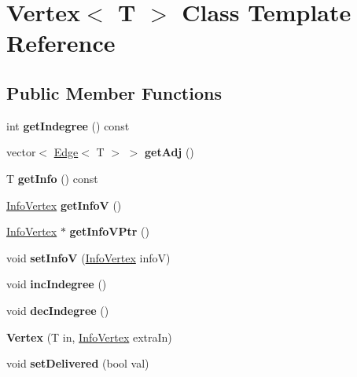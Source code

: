 \hypertarget{class_vertex}{}\section{Vertex$<$ T $>$ Class Template Reference}
\label{class_vertex}
\subsection*{Public Member Functions}
\begin{DoxyCompactItemize}
\item 
\hypertarget{class_vertex_ac78980191ea1f9d22e6617e9e511b755}{}\label{class_vertex_ac78980191ea1f9d22e6617e9e511b755} 
int {\bfseries get\+Indegree} () const
\item 
\hypertarget{class_vertex_aa8f7822976771f28e9a37199bcab69aa}{}\label{class_vertex_aa8f7822976771f28e9a37199bcab69aa} 
vector$<$ \hyperlink{class_edge}{Edge}$<$ T $>$ $>$ {\bfseries get\+Adj} ()
\item 
\hypertarget{class_vertex_a48eae2f7af2362634adab02b7b2dbec6}{}\label{class_vertex_a48eae2f7af2362634adab02b7b2dbec6} 
T {\bfseries get\+Info} () const
\item 
\hypertarget{class_vertex_aa060ea5a18371292e64b9773e9909e0e}{}\label{class_vertex_aa060ea5a18371292e64b9773e9909e0e} 
\hyperlink{class_info_vertex}{Info\+Vertex} {\bfseries get\+InfoV} ()
\item 
\hypertarget{class_vertex_acaa7406416fb6a8de4dfdd176d178d26}{}\label{class_vertex_acaa7406416fb6a8de4dfdd176d178d26} 
\hyperlink{class_info_vertex}{Info\+Vertex} $\ast$ {\bfseries get\+Info\+V\+Ptr} ()
\item 
\hypertarget{class_vertex_a08f74b6f22c5cc00f01e5d4e23e00c0c}{}\label{class_vertex_a08f74b6f22c5cc00f01e5d4e23e00c0c} 
void {\bfseries set\+InfoV} (\hyperlink{class_info_vertex}{Info\+Vertex} infoV)
\item 
\hypertarget{class_vertex_aac818849dc16979a31e17aa5f183b2eb}{}\label{class_vertex_aac818849dc16979a31e17aa5f183b2eb} 
void {\bfseries inc\+Indegree} ()
\item 
\hypertarget{class_vertex_a2c9f37bf604d2bea25438a78c142357e}{}\label{class_vertex_a2c9f37bf604d2bea25438a78c142357e} 
void {\bfseries dec\+Indegree} ()
\item 
\hypertarget{class_vertex_aec855a558e937874d6a9aa718000c98e}{}\label{class_vertex_aec855a558e937874d6a9aa718000c98e} 
{\bfseries Vertex} (T in, \hyperlink{class_info_vertex}{Info\+Vertex} extra\+In)
\item 
\hypertarget{class_vertex_a7976f37ab7870ee2a18a4f84b22aa04c}{}\label{class_vertex_a7976f37ab7870ee2a18a4f84b22aa04c} 
void {\bfseries set\+Delivered} (bool val)
\end{DoxyCompactItemize}
